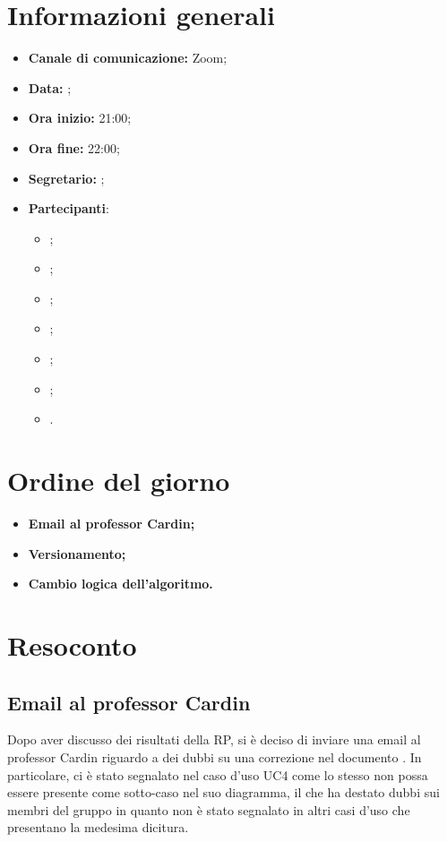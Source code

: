 \section{Informazioni generali}

\begin{itemize}

    \item \textbf{Canale di comunicazione:} Zoom;

    \item \textbf{Data:} \DataMeeting{};

    \item \textbf{Ora inizio:} 21:00;

    \item \textbf{Ora fine:} 22:00;

    \item \textbf{Segretario:} \ACapoRedazione{};

    \item \textbf{Partecipanti}:
        \begin{itemize}
            \item \Daniele{};
            \item \Davide{};
            \item \Francesco{};
            \item \Giosue{};
            \item \Lucrezia{};
            \item \Matteo{};
            \item \Tommaso{}.
        \end{itemize}
\end{itemize}

\section{Ordine del giorno}

\begin{itemize}
    \item\textbf{Email al professor Cardin;}
    \item\textbf{Versionamento;}
    \item\textbf{Cambio logica dell'algoritmo.}
\end{itemize}
\newpage


\section{Resoconto}

\subsection{Email al professor Cardin}
Dopo aver discusso dei risultati della RP, si è deciso di inviare una email al professor Cardin riguardo a dei dubbi su una correzione nel documento \AdR{}.  In particolare, ci è stato segnalato nel caso d'uso UC4 come lo stesso non possa essere presente come sotto-caso nel suo diagramma, il che ha destato dubbi sui membri del gruppo in quanto non è stato segnalato in altri casi d'uso che presentano la medesima dicitura.


